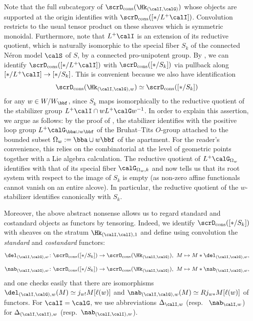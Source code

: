 \documentclass[10pt, reqno]{amsart}
\theoremstyle{plain}
\theoremstyle{definition}
\numberwithin{equation}{section}
\begin{document}
	Note that the full subcategory of $\scrD_{\mathrm{cons}}(\Hk_{(\calI,\calG)})$ whose objects are supported at the origin identifies with $\scrD_{\mathrm{cons}}([*/L^+\calI])$. Convolution restricts to the usual tensor product on these sheaves which is symmetric monoidal. Furthermore, note that $L^+\calI$ is an extension of its reductive quotient, which is naturally isomorphic to the special fiber $S_k$ of the connected Néron model $\calS$ of $S$, by a connected pro-unipotent group. By \cite[Proposition VI.4.1]{FS21}, we can identify $\scrD_{\mathrm{cons}}([*/L^+\calI])$ with $\scrD_{\mathrm{cons}}([*/S_k])$ via pullback along $[\ast/L^+\calI]\to [\ast/S_k]$. This is convenient because we also have identification
	\begin{equation}\label{equation_identification}
		\scrD_{\mathrm{cons}}(\Hk_{ (\calI,\calG),w})\simeq    \scrD_{\mathrm{cons}}([*/S_k])     
	\end{equation}
	for any $w \in W/W_\bbf$, since $S_k$ maps isomorphically to the reductive quotient of the stabilizer group $L^+\calI \cap wL^+\calG w^{-1}$. In order to explain this assertion, we argue as follows: by the proof of \cite[Corollary 1.3]{Ric16}, the stabilizer identifies with the positive loop group $L^+\calG_{\bba \cup w\bbf}$ of the Bruhat--Tits $O$-group attached to the bounded subset $\Omega_w:=\bba \cup w\bbf$ of the apartment. For the reader's convenience, this relies on the combinatorial \cite[Lemma 7.7.4]{KP23} at the level of geometric points together with a Lie algebra calculation. The reductive quotient of $L^+\calG_{\Omega_w}$ identifies with that of its special fiber $\calG_{\Omega_w,k}$ and now \cite[Proposition 8.4.8]{KP23} tells us that its root system with respect to the image of $S_k$ is empty (as non-zero affine functionals cannot vanish on an entire alcove). In particular, the reductive quotient of the $w$-stabilizer identifies canonically with $S_k$.
	
	Moreover, the above abstract nonsense allows us to regard standard and costandard objects as functors by tensoring. Indeed, we identify $\scrD_{\mathrm{cons}}([\ast/S_k])$ with sheaves on the stratum $\Hk_{(\calI,\calI),1}$ and define  using convolution the \textit{standard} and \textit{costandard} functors:
	\begin{equation}
		\del_{(\calI,\calG),w}\colon \scrD_{\mathrm{cons}}([*/S_k])\to \scrD_{\mathrm{cons}}(\Hk_{(\calI,\calG)}),\ M \mapsto M\ast \del_{(\calI,\calG),w} ,
	\end{equation}
	\begin{equation}\nab_{(\calI,\calG),w} \colon \scrD_{\mathrm{cons}}([*/S_k])\to \scrD_{\mathrm{cons}}(\Hk_{(\calI,\calG)}),\ M \mapsto M\ast \nab_{(\calI,\calG),w} ,
	\end{equation}
	and one checks easily that there are isomorphisms $\del_{(\calI,\calG),w}(M)\simeq j_{w!}M[\ell(w)]$ and $\nab_{(\calI,\calG),w}(M)\simeq Rj_{w*}M[\ell(w)]$ of functors.  For $\calI=\calG$, we use abbreviations $\Delta_{\calI,w}$ (resp.~ $\nab_{\calI,w}$) for $\Delta_{(\calI,\calI),w}$ (resp.~$\nab_{(\calI,\calI),w}$).
	
\end{document}
